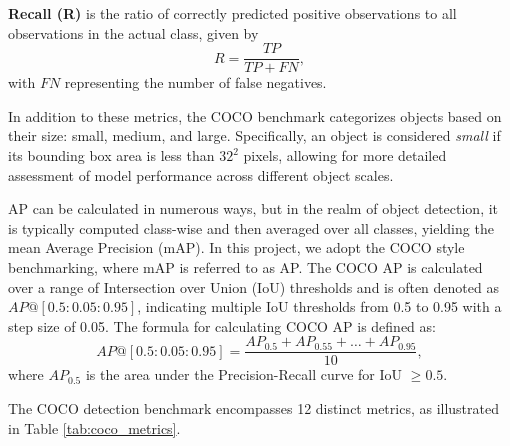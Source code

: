 \documentclass[report.tex]{subfiles}
\begin{document}
    \textbf{Recall (R)} is the ratio of correctly predicted positive observations to all observations in the actual class, given by 
    \[
    R = \frac{TP}{TP + FN},
    \]
    with \( FN \) representing the number of false negatives.

    In addition to these metrics, the COCO benchmark categorizes objects based on their size: small, medium, and large. Specifically, an object is considered \textit{small} if its bounding box area is less than \( 32^2 \) pixels, allowing for more detailed assessment of model performance across different object scales.

    AP can be calculated in numerous ways, but in the realm of object detection, it is typically computed class-wise and then averaged over all classes, yielding the mean Average Precision (mAP). In this project, we adopt the COCO style benchmarking, where mAP is referred to as AP. The COCO AP is calculated over a range of Intersection over Union (IoU) thresholds and is often denoted as \( AP@[0.5:0.05:0.95] \), indicating multiple IoU thresholds from 0.5 to 0.95 with a step size of 0.05. The formula for calculating COCO AP is defined as:
    \[
    AP@[0.5:0.05:0.95] = \frac{AP_{0.5} + AP_{0.55} + \ldots + AP_{0.95}}{10},
    \]
    where \( AP_{0.5} \) is the area under the Precision-Recall curve for IoU \(\geq 0.5\). 

    
    The COCO detection benchmark encompasses 12 distinct metrics, as illustrated in Table \ref{tab:coco_metrics}.
\end{document}
